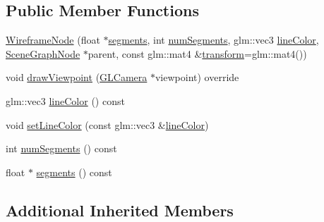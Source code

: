 \subsection*{Public Member Functions}
\begin{DoxyCompactItemize}
\item 
\hyperlink{classmotorcar_1_1WireframeNode_aa20d4f27da8395ba0d12f8fb0aa3631b}{Wireframe\-Node} (float $\ast$\hyperlink{classmotorcar_1_1WireframeNode_aedf65e6feb6cebaa7cf0e95819386a72}{segments}, int \hyperlink{classmotorcar_1_1WireframeNode_aeffe078a56d3a162de14e26a96bc474d}{num\-Segments}, glm\-::vec3 \hyperlink{classmotorcar_1_1WireframeNode_a70dd1214503a3650d6a919cb6b7c5313}{line\-Color}, \hyperlink{classmotorcar_1_1SceneGraphNode}{Scene\-Graph\-Node} $\ast$parent, const glm\-::mat4 \&\hyperlink{classmotorcar_1_1SceneGraphNode_ad96e79fdd739ac8223a3128003be391a}{transform}=glm\-::mat4())
\item 
void \hyperlink{classmotorcar_1_1WireframeNode_a9256807100fb8d169d7f4e1c657463d7}{draw\-Viewpoint} (\hyperlink{classmotorcar_1_1GLCamera}{G\-L\-Camera} $\ast$viewpoint) override
\item 
glm\-::vec3 \hyperlink{classmotorcar_1_1WireframeNode_a70dd1214503a3650d6a919cb6b7c5313}{line\-Color} () const 
\item 
void \hyperlink{classmotorcar_1_1WireframeNode_a915a448da09b9cb24ecdeec38ee8a8a9}{set\-Line\-Color} (const glm\-::vec3 \&\hyperlink{classmotorcar_1_1WireframeNode_a70dd1214503a3650d6a919cb6b7c5313}{line\-Color})
\item 
int \hyperlink{classmotorcar_1_1WireframeNode_aeffe078a56d3a162de14e26a96bc474d}{num\-Segments} () const 
\item 
float $\ast$ \hyperlink{classmotorcar_1_1WireframeNode_aedf65e6feb6cebaa7cf0e95819386a72}{segments} () const 
\end{DoxyCompactItemize}
\subsection*{Additional Inherited Members}


